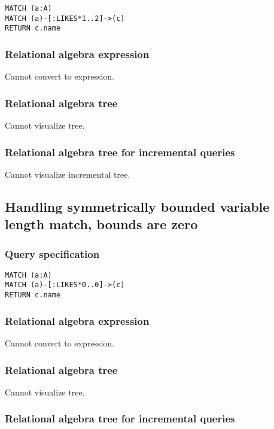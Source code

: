 \begin{lstlisting}
MATCH (a:A)
MATCH (a)-[:LIKES*1..2]->(c)
RETURN c.name
\end{lstlisting}

\subsubsection*{Relational algebra expression}

Cannot convert to expression.

\subsubsection*{Relational algebra tree}

Cannot visualize tree.

\subsubsection*{Relational algebra tree for incremental queries}

Cannot visualize incremental tree.

\subsection{Handling symmetrically bounded variable length match, bounds are zero}

\subsubsection*{Query specification}

\begin{lstlisting}
MATCH (a:A)
MATCH (a)-[:LIKES*0..0]->(c)
RETURN c.name
\end{lstlisting}

\subsubsection*{Relational algebra expression}

Cannot convert to expression.

\subsubsection*{Relational algebra tree}

Cannot visualize tree.

\subsubsection*{Relational algebra tree for incremental queries}

